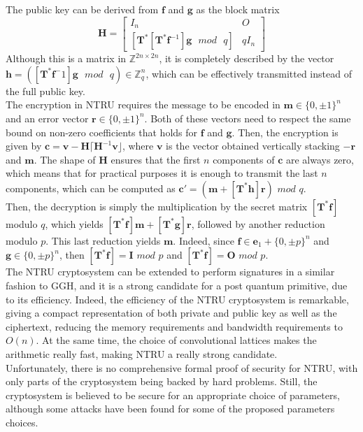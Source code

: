 The public key can be derived from $\mathbf{f}$ and $\mathbf{g}$  as the block matrix
\begin{equation*}
\mathbf{H}=
\left[\begin{array}{c|c}
I_n & O \\
\hline
[\mathbf{T}^*[\mathbf{T}^*\mathbf{f}^{-1}]\mathbf{g}\text{ }mod\text{ }q] & qI_n
\end{array}\right]
\end{equation*}
Although this is a matrix in $\mathbb{Z}^{2n\times 2n}$, it is completely described by the vector \mbox{$\mathbf{h}=([\mathbf{T}^*\mathbf{f}^-1]\mathbf{g}\text{ }mod\text{ }q)\in\mathbb{Z}_q^n$}, which can be effectively transmitted instead of the full public key.\\
The encryption in NTRU requires the message to be encoded in $\mathbf{m}\in\{0,\pm1\}^n$ and an error vector $\mathbf{r}\in\{0,\pm1\}^n$. Both of these vectors need to respect the same bound on non-zero coefficients that holds for $\mathbf{f}$ and $\mathbf{g}$. Then, the encryption is given by $\mathbf{c}=\mathbf{v}-\mathbf{H}\lceil\mathbf{H}^{-1}\mathbf{v}\rfloor$, where $\mathbf{v}$ is the vector obtained vertically stacking $-\mathbf{r}$ and $\mathbf{m}$. The shape of $\mathbf{H}$ ensures that the first $n$ components of $\mathbf{c}$ are always zero, which means that for practical purposes it is enough to transmit the last $n$ components, which can be computed as $\mathbf{c}'=(\mathbf{m}+[\mathbf{T}^*\mathbf{h}]\mathbf{r})$ $mod$ $q$.\\
Then, the decryption is simply the multiplication by the secret matrix $[\mathbf{T}^*\mathbf{f}]$ modulo $q$, which yields $[\mathbf{T}^*\mathbf{f}]\mathbf{m} + [\mathbf{T}^*\mathbf{g}]\mathbf{r}$, followed by another reduction modulo $p$. This last reduction yields $\mathbf{m}$. Indeed, since $\mathbf{f}\in\mathbf{e}_1+\{0,\pm p\}^n$ and $\mathbf{g}\in\{0,\pm p\}^n$, then $[\mathbf{T}^*\mathbf{f}]=\mathbf{I}$ $mod$ $p$ and $[\mathbf{T}^*\mathbf{f}]=\mathbf{O}$ $mod$ $p$.\\
The NTRU cryptosystem can be extended to perform signatures in a similar fashion to GGH, and it is a strong candidate for a post quantum primitive, due to its efficiency. Indeed, the efficiency of the NTRU cryptosystem is remarkable, giving a compact representation of both private and public key as well as the ciphertext, reducing the memory requirements and bandwidth requirements to $O(n)$. At the same time, the choice of convolutional lattices makes the arithmetic really fast, making NTRU a really strong candidate.\\
Unfortunately, there is no comprehensive formal proof of security for NTRU, with only parts of the cryptosystem being backed by hard problems. Still, the cryptosystem is believed to be secure for an appropriate choice of parameters, although some attacks have been found for some of the proposed parameters choices.

